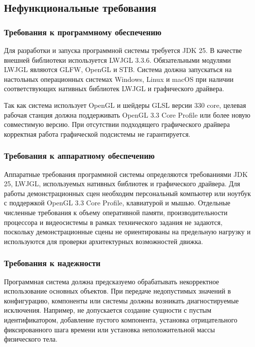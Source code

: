 \subsection{Нефункциональные требования}

\subsubsection{Требования к программному обеспечению}

Для разработки и запуска программной системы требуется JDK 25. В качестве внешней библиотеки используется LWJGL 3.3.6. Обязательными модулями LWJGL являются GLFW, OpenGL и STB. Система должна запускаться на настольных операционных системах Windows, Linux и macOS при наличии соответствующих нативных библиотек LWJGL и графического драйвера.

Так как система использует OpenGL и шейдеры GLSL версии 330 core, целевая рабочая станция должна поддерживать OpenGL 3.3 Core Profile или более новую совместимую версию. При отсутствии подходящего графического драйвера корректная работа графической подсистемы не гарантируется.

\subsubsection{Требования к аппаратному обеспечению}

Аппаратные требования программной системы определяются требованиями JDK 25, LWJGL, используемых нативных библиотек и графического драйвера. Для работы демонстрационных сцен необходим персональный компьютер или ноутбук с поддержкой OpenGL 3.3 Core Profile, клавиатурой и мышью. Отдельные численные требования к объему оперативной памяти, производительности процессора и видеосистемы в рамках технического задания не задаются, поскольку демонстрационные сцены не ориентированы на предельную нагрузку и используются для проверки архитектурных возможностей движка.

\subsubsection{Требования к надежности}

Программная система должна предсказуемо обрабатывать некорректное использование основных объектов. При передаче недопустимых значений в конфигурацию, компоненты или системы должны возникать диагностируемые исключения. Например, не допускается создание сущности с пустым идентификатором, добавление пустого компонента, установка отрицательного фиксированного шага времени или установка неположительной массы физического тела.

